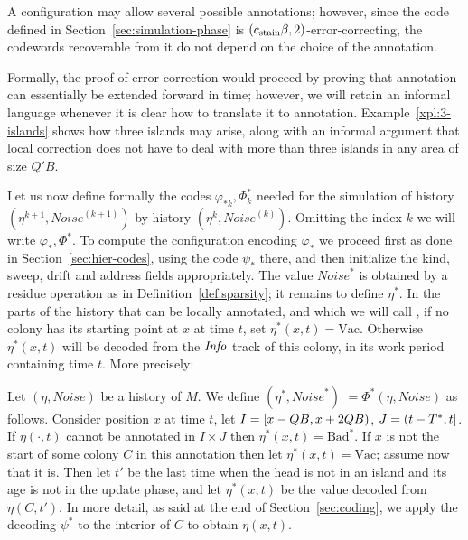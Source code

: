 \documentclass[11pt]{memoir}
\theoremstyle{definition} %
\newcommand{\fld}[1]{\ensuremath{\textit{#1\/}}}
\def\B{B}
\newcommand{\Noise}{\mathit{Noise}}
\newcommand{\Q}{Q} %
\newcommand{\Tus}{T^{*}}
\newcommand{\Info}{\fld{Info}}
\newcommand{\Bad}{\mathrm{Bad}}
\newcommand{\Vacant}{\mathrm{Vac}}
\newcommand{\cns}[1]{c_{\textrm{\upshape #1}}}
\newcommand{\CStain}{\cns{stain}}
\begin{document}
A configuration may allow several possible annotations;
however, since the code defined in Section~\ref{sec:simulation-phase}
is \( (\CStain\beta,2) \)-error-correcting, 
the codewords recoverable from it do not depend on the choice of the annotation.

Formally, the proof of error-correction would proceed by proving that
annotation can essentially be extended forward in time; however, we will retain an informal language
whenever it is clear how to translate it to annotation.
Example~\ref{xpl:3-islands} shows how three islands may arise, along with
an informal argument that local correction
does not have to deal with more than three islands in any area of size \( \Q'\B \). 

Let us now define formally the codes \( \varphi_{*k},\Phi_{k}^{*} \) needed
for the simulation of history \( (\eta^{k+1},\Noise^{(k+1)}) \) by history \( (\eta^{k},\Noise^{(k)}) \).
Omitting the index \( k \) we will write \( \varphi_{*},\Phi^{*} \).
To compute the configuration encoding \( \varphi_{*} \) we proceed first as
done in Section~\ref{sec:hier-codes}, using the code \( \psi_{*} \) there,
and then initialize the kind, sweep, drift and address fields appropriately.
The value \( \Noise^{*} \) is obtained by a residue operation
as in Definition~\ref{def:sparsity}; it remains to define \( \eta^{*} \).
In the parts of the history that can be locally annotated, and which we will call ,
if no colony has its starting point at \( x \) at time \( t \), set \( \eta^{*}(x,t)=\Vacant \).
Otherwise \( \eta^{*}(x,t) \) will be decoded from
the \( \Info \) track of this colony, in its work period containing time \( t \).
More precisely:

\begin{definition}[Scale-up]\label{def:scale-up}
Let \( (\eta,\Noise) \) be a history of \( M \).
We define \( (\eta^{*},\Noise^{*}) \) \( =\Phi^{*}(\eta,\Noise) \) as follows.
Consider position \( x \) at time \( t \), let \( I=\lint{x-\Q\B}{x+2\Q\B} \),
\( J =\rint{t-\Tus}{t} \).
If \( \eta(\cdot,t) \) cannot be annotated in \( I\times J \)
then \( \eta^{*}(x,t)=\Bad^{*} \).
If \( x \) is not the start of some colony \( C \) in this annotation
then let \( \eta^{*}(x,t)=\Vacant \); assume now that it is.
Then let \( t' \) be the last time when the head is not in an island and its age
is not in the update phase, and let
\( \eta^{*}(x,t) \) be the value decoded from \( \eta(C,t') \).
In more detail, as said at the end of Section~\ref{sec:coding}, we apply the decoding
\( \psi^{*} \) to the interior of \( C \) to obtain \( \eta(x,t) \).
\end{definition}
\end{document}
